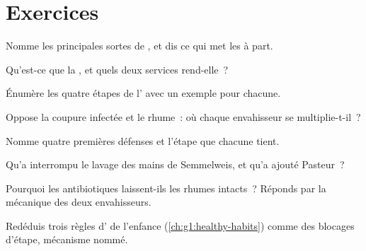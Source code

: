 \section{Exercices}

\begin{exercise}[$\star$]\label{exo:g9:microbes-and-infection:1}
Nomme les principales sortes de , et dis ce qui met
les  à part.
\end{exercise}

\begin{exercise}[$\star$]\label{exo:g9:microbes-and-infection:2}
Qu'est-ce que la , et quels deux services
rend-elle~?
\end{exercise}

\begin{exercise}[$\star$]\label{exo:g9:microbes-and-infection:3}
Énumère les quatre étapes de l' avec un exemple
pour chacune.
\end{exercise}

\begin{exercise}[$\star$]\label{exo:g9:microbes-and-infection:4}
Oppose la coupure infectée et le rhume~: où chaque
envahisseur se multiplie-t-il~?
\end{exercise}

\begin{exercise}[$\star$]\label{exo:g9:microbes-and-infection:5}
Nomme quatre premières défenses et l'étape que chacune tient.
\end{exercise}

\begin{exercise}[$\star$]\label{exo:g9:microbes-and-infection:6}
Qu'a interrompu le lavage des mains de Semmelweis, et
qu'a ajouté Pasteur~?
\end{exercise}

\begin{exercise}[$\star\star$]\label{exo:g9:microbes-and-infection:7}
Pourquoi les antibiotiques laissent-ils les rhumes
intacts~? Réponds par la mécanique des deux envahisseurs.
\end{exercise}

\begin{exercise}[$\star\star$]\label{exo:g9:microbes-and-infection:8}
Redéduis trois règles d' de l'enfance
(\cref{ch:g1:healthy-habits}) comme des blocages d'étape,
mécanisme nommé.
\end{exercise}

